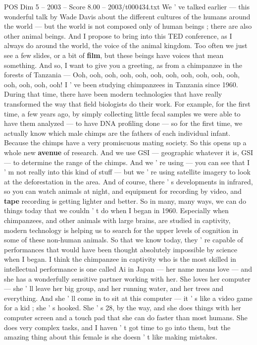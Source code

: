 \begin{textsample}{POS Dim 5 – 2003 – Score 8.00 – 2003/t000434.txt}
We ' ve talked earlier — this wonderful talk by Wade Davis about the different cultures of the humans around the world — but the world is not composed only of human beings ; there are also other animal beings.
And I propose to bring into this TED conference, as I always do around the world, the voice of the animal kingdom.
Too often we just see a few slides, or a bit of \textbf{film}, but these beings have voices that mean something.
And so, I want to give you a greeting, as from a chimpanzee in the forests of Tanzania — Ooh, ooh, ooh, ooh, ooh, ooh, ooh, ooh, ooh, ooh, ooh, ooh, ooh, ooh, ooh!
I ' ve been studying chimpanzees in Tanzania since 1960.
During that time, there have been modern technologies that have really transformed the way that field biologists do their work.
For example, for the first time, a few years ago, by simply collecting little fecal samples we were able to have them analyzed — to have DNA profiling done — so for the first time, we actually know which male chimps are the fathers of each individual infant.
Because the chimps have a very promiscuous mating society.
So this opens up a whole new \textbf{avenue} of research.
And we use GSI — geographic whatever it is, GSI — to determine the range of the chimps.
And we ' re using — you can see that I ' m not really into this kind of stuff — but we ' re using satellite imagery to look at the deforestation in the area.
And of course, there ' s developments in infrared, so you can watch animals at night, and equipment for recording by video, and \textbf{tape} recording is getting lighter and better.
So in many, many ways, we can do things today that we couldn ' t do when I began in 1960.
Especially when chimpanzees, and other animals with large brains, are studied in captivity, modern technology is helping us to search for the upper levels of cognition in some of these non-human animals.
So that we know today, they ' re capable of performances that would have been thought absolutely impossible by science when I began.
I think the chimpanzee in captivity who is the most skilled in intellectual performance is one called Ai in Japan — her name means love — and she has a wonderfully sensitive partner working with her.
She loves her computer — she ' ll leave her big group, and her running water, and her trees and everything.
And she ' ll come in to sit at this computer — it ' s like a video game for a kid ; she ' s hooked.
She ' s 28, by the way, and she does things with her computer screen and a touch pad that she can do faster than most humans.
She does very complex tasks, and I haven ' t got time to go into them, but the amazing thing about this female is she doesn ' t like making mistakes.

\end{textsample}

